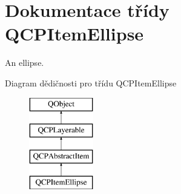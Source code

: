 \hypertarget{classQCPItemEllipse}{}\section{Dokumentace třídy Q\+C\+P\+Item\+Ellipse}
\label{classQCPItemEllipse}


An ellipse.  


Diagram dědičnosti pro třídu Q\+C\+P\+Item\+Ellipse\begin{figure}[H]
\begin{center}
\leavevmode
\includegraphics[height=4.000000cm]{classQCPItemEllipse}
\end{center}
\end{figure}

